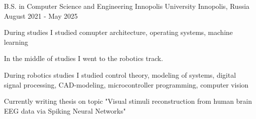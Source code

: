 

\begin{cventries}

  \cventry
    {B.S. in Computer Science and Engineering} %
    {Innopolis University} %
    {Innopolis, Russia} %
    {August 2021 - May 2025} %
    {
      \begin{cvitems} %
        \item {During studies I studied comupter architecture, operating systems, machine learning}
        \item {In the middle of studies I went to the robotics track. }
        \item {During robotics studies I studied control theory, modeling of systems, digital signal processing, CAD-modeling, microcontroller programming, computer vision }
        \item {Currently writing thesis on topic "Visual stimuli reconstruction from human brain EEG data via Spiking Neural Networks"}
      \end{cvitems}
    }

\end{cventries}
